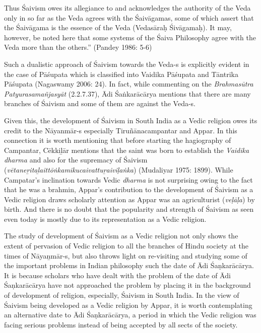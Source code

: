 \begin{myquote}
Thus Śaivism owes its allegiance to and acknowledges the authority of the Veda only in so far as the Veda agrees with the Śaivāgamas, some of which assert that the Śaivāgama is the essence of the Veda (Vedasāraḥ Śivāgamaḥ). It may, however, be noted here that some systems of the Śaiva Philosophy agree with the Veda more than the others.” (Pandey 1986: 5-6)
\end{myquote}

\vskip 1pt

Such a dualistic approach of Śaivism towards the Veda-s is explicitly evident in the case of Pāśupata which is classified into Vaidika Pāśupata and Tāntrika Pāśupata (Nagaswamy 2006: 24). In fact, while commenting on the \textit{Brahmasūtra Patyurasamañjasyāt} (2.2.7.37), Ādi Śaṅkarācārya mentions that there are many branches of Śaivism and some of them are against the Veda-s.

\vskip 1pt

Given this, the development of Śaivism in South India as a Vedic religion owes its credit to the Nāyanmār-s especially Tiruñānacampantar and Appar. In this connection it is worth mentioning that before starting the hagiography of Campantar, Cēkkiḻār mentions that the saint was born to establish the \textit{Vaidika dharma }and also for the supremacy of Śaivism (\textit{vētaneṟitaḻaittōṅkamikucaivattuṟaiviḷaṅka}) (Mudaliyar 1975: 1899). While Campatar’s inclination towards Vedic \textit{dharma} is not surprising owing to the fact that he was a brahmin, Appar’s contribution to the development of Śaivism as a Vedic religion draws scholarly attention as Appar was an agriculturist (\textit{veḷāḷa}) by birth. And there is no doubt that the popularity and strength of Śaivism as seen even today is mostly due to its representation as a Vedic religion.

\vskip 1pt

The study of development of Śaivism as a Vedic religion not only shows the extent of pervasion of Vedic religion to all the branches of Hindu society at the times of Nāyaṉmār-s, but also throws light on re-visiting and studying some of the important problems in Indian philosophy such the date of Ādi Śaṇkarācārya. It is because scholars who have dealt with the problem of the date of Ādi Śaṇkarācārya have not approached the problem by placing it in the background of development of religion, especially, Śaivism in South India. In the view of Śaivism being developed as a Vedic religion by Appar, it is worth contemplating an alternative date to Ādi Śaṇkarācārya, a period in which the Vedic religion was facing serious problems instead of being accepted by all sects of the society.


